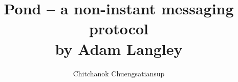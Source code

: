 \documentclass[xcolor=dvipsnames]{beamer}
\begin{document}
\title
[Pond -- a non-instant messaging protocol by Adam Langley \hspace{0.5mm} \insertframenumber]
{Pond -- a non-instant messaging protocol \\by Adam Langley}
\author{Chitchanok Chuengsatiansup}
\date{}

\frame{\titlepage}







\end{document}
